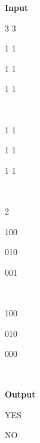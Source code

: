 \textbf{Input}

3 3

1 1

1 1

1 1

 

1 1

1 1

1 1

 

2

100

010

001

 

100

010

000

 

\textbf{Output}

YES

NO